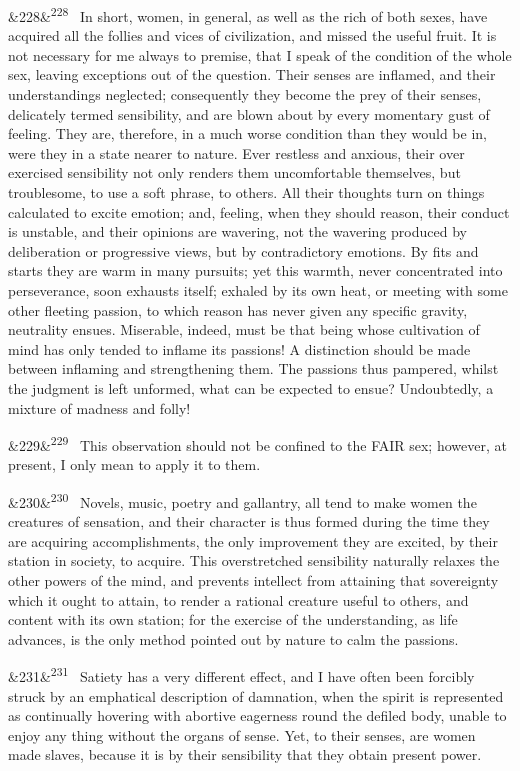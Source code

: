 \documentclass[12pt]{article}
\newcommand{\para}[1][]{\par\noindent\ifx&#1&\else\textsuperscript{\footnotesize #1}~\fi}
\begin{document}
\para[228] In short, women, in general, as well as the rich of both sexes, have acquired all the follies and vices of civilization, and missed the useful fruit. It is not necessary for me always to premise, that I speak of the condition of the whole sex, leaving exceptions out of the question. Their senses are inflamed, and their understandings neglected; consequently they become the prey of their senses, delicately termed sensibility, and are blown about by every momentary gust of feeling. They are, therefore, in a much worse condition than they would be in, were they in a state nearer to nature. Ever restless and anxious, their over exercised sensibility not only renders them uncomfortable themselves, but troublesome, to use a soft phrase, to others. All their thoughts turn on things calculated to excite emotion; and, feeling, when they should reason, their conduct is unstable, and their opinions are wavering, not the wavering produced by deliberation or progressive views, but by contradictory emotions. By fits and starts they are warm in many pursuits; yet this warmth, never concentrated into perseverance, soon exhausts itself; exhaled by its own heat, or meeting with some other fleeting passion, to which reason has never given any specific gravity, neutrality ensues. Miserable, indeed, must be that being whose cultivation of mind has only tended to inflame its passions! A distinction should be made between inflaming and strengthening them. The passions thus pampered, whilst the judgment is left unformed, what can be expected to ensue? Undoubtedly, a mixture of madness and folly!

\para[229] This observation should not be confined to the FAIR sex; however, at present, I only mean to apply it to them.

\para[230] Novels, music, poetry and gallantry, all tend to make women the creatures of sensation, and their character is thus formed during the time they are acquiring accomplishments, the only improvement they are excited, by their station in society, to acquire. This overstretched sensibility naturally relaxes the other powers of the mind, and prevents intellect from attaining that sovereignty which it ought to attain, to render a rational creature useful to others, and content with its own station; for the exercise of the understanding, as life advances, is the only method pointed out by nature to calm the passions.

\para[231] Satiety has a very different effect, and I have often been forcibly struck by an emphatical description of damnation, when the spirit is represented as continually hovering with abortive eagerness round the defiled body, unable to enjoy any thing without the organs of sense. Yet, to their senses, are women made slaves, because it is by their sensibility that they obtain present power.
\end{document}
